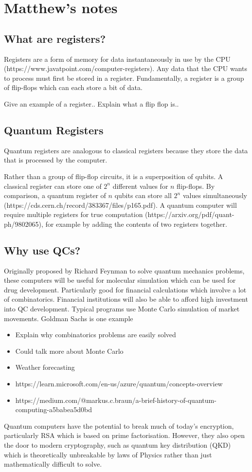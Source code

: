 \section{Matthew's notes}

\subsection{What are registers?}
Registers are a form of memory for data instantaneously in use by the CPU (https://www.javatpoint.com/computer-registers). Any data that the CPU wants to process must first be stored in a register. Fundamentally, a register is a group of flip-flops which can each store a bit of data. 

Give an example of a register..
Explain what a flip flop is..

\subsection{Quantum Registers}
Quantum registers are analogous to classical registers because they store the data that is processed by the computer. 

Rather than a group of flip-flop circuits, it is a superposition of qubits. A classical register can store one of $2^n$ different values for $n$ flip-flops. By comparison, a quantum register of $n$ qubits can store all $2^n$ values simultaneously (https://cds.cern.ch/record/383367/files/p165.pdf). A quantum computer will require multiple registers for true computation (https://arxiv.org/pdf/quant-ph/9802065), for example by adding the contents of two registers together.

\subsection{Why use QCs?}
Originally proposed by Richard Feynman to solve quantum mechanics problems, these computers will be useful for molecular simulation which can be used for drug development. Particularly good for financial calculations which involve a lot of combinatorics. Financial institutions will also be able to afford high investment into QC development. Typical programs use Monte Carlo simulation of market movements. Goldman Sachs is one example

\begin{itemize}

\item Explain why combinatorics problems are easily solved
\item Could talk more about Monte Carlo
\item Weather forecasting
\item https://learn.microsoft.com/en-us/azure/quantum/concepts-overview
\item https://medium.com/@markus.c.braun/a-brief-history-of-quantum-computing-a5babea5d0bd
\end{itemize}
Quantum computers have the potential to break much of today's encryption, particularly RSA which is based on prime factorisation. However, they also open the door to modern cryptography, such as quantum key distribution (QKD) which is theoretically unbreakable by laws of Physics rather than just mathematically difficult to solve.

